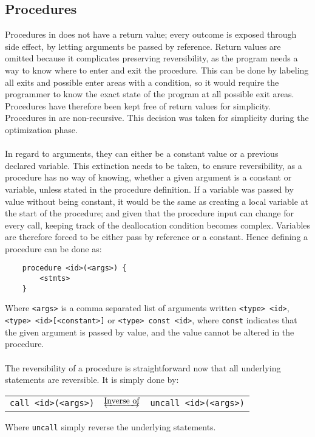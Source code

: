 \subsection{Procedures}
Procedures in \lan does not have a return value; every outcome is exposed through side
effect, by letting arguments be passed by reference. Return values are omitted because it
complicates preserving reversibility, as the program needs a way to know where to enter and exit
the procedure. This can be done by labeling all exits and possible enter areas with a condition,
so it would require the programmer to know the exact state of the program at all possible exit areas.
Procedures have therefore been kept free of return values for simplicity. Procedures in \lan are
non-recursive. This decision was taken for simplicity during the optimization phase.
\\
\\
In regard to arguments, they can either be a constant value or a previous declared variable. This
extinction needs to be taken, to ensure reversibility, as a procedure has no way of knowing, whether
a given argument is a constant or variable, unless stated in the procedure definition. If a variable
was passed by value without being constant, it would be the same as creating a local variable at
the start of the procedure; and given that the procedure input can change for every call, keeping
track of the deallocation condition becomes complex. Variables are therefore forced to be either
pass by reference or a constant. Hence defining a procedure can be done as:

\begin{lstlisting}
    procedure <id>(<args>) {
        <stmts>
    }
\end{lstlisting}
\noindent
Where \texttt{<args>} is a comma separated list of arguments written \texttt{<type> <id>},
\texttt{<type> <id>[<constant>]} or
\texttt{<type> const <id>}, where \texttt{const} indicates that the given argument is passed by
value, and the value cannot be altered in the procedure.
\\
\\
The reversibility of a procedure is straightforward now that all underlying statements are
reversible. It is simply done by:

\begin{table*}[!h]
    \centering
    \begin{tabular}{lcl}
        \texttt{call <id>(<args>)} & $\underleftrightarrow{\text{Inverse of}}$ & \texttt{uncall <id>(<args>)}
    \end{tabular}
\end{table*}
\noindent
Where \texttt{uncall} simply reverse the underlying statements.

